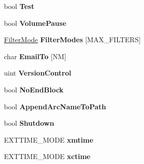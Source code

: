 \begin{DoxyCompactItemize}
\item 
\hypertarget{class_r_a_r_options_ad50969d316601f42fc2f74ac52f093e9}{bool {\bfseries Test}}\label{class_r_a_r_options_ad50969d316601f42fc2f74ac52f093e9}

\item 
\hypertarget{class_r_a_r_options_a0f8d1e8989441c929ec92ed304f2876a}{bool {\bfseries Volume\-Pause}}\label{class_r_a_r_options_a0f8d1e8989441c929ec92ed304f2876a}

\item 
\hypertarget{class_r_a_r_options_aa7bfad6f9becd063848c1431f6bcf654}{\hyperlink{struct_filter_mode}{Filter\-Mode} {\bfseries Filter\-Modes} \mbox{[}M\-A\-X\-\_\-\-F\-I\-L\-T\-E\-R\-S\mbox{]}}\label{class_r_a_r_options_aa7bfad6f9becd063848c1431f6bcf654}

\item 
\hypertarget{class_r_a_r_options_a52eba8e766200200a8af6b711e4b7929}{char {\bfseries Email\-To} \mbox{[}N\-M\mbox{]}}\label{class_r_a_r_options_a52eba8e766200200a8af6b711e4b7929}

\item 
\hypertarget{class_r_a_r_options_acd4940bd4fe84ff26444c2f5fad5d5bb}{uint {\bfseries Version\-Control}}\label{class_r_a_r_options_acd4940bd4fe84ff26444c2f5fad5d5bb}

\item 
\hypertarget{class_r_a_r_options_af68d3deb81260eb013ec986632655c02}{bool {\bfseries No\-End\-Block}}\label{class_r_a_r_options_af68d3deb81260eb013ec986632655c02}

\item 
\hypertarget{class_r_a_r_options_a6ac1a458fc60872fdb5d7f7003d0ec37}{bool {\bfseries Append\-Arc\-Name\-To\-Path}}\label{class_r_a_r_options_a6ac1a458fc60872fdb5d7f7003d0ec37}

\item 
\hypertarget{class_r_a_r_options_a3de54f7ef0a722cec1a44802595bf5dd}{bool {\bfseries Shutdown}}\label{class_r_a_r_options_a3de54f7ef0a722cec1a44802595bf5dd}

\item 
\hypertarget{class_r_a_r_options_a8e73d96b8920136dcfed7ae3574da95b}{E\-X\-T\-T\-I\-M\-E\-\_\-\-M\-O\-D\-E {\bfseries xmtime}}\label{class_r_a_r_options_a8e73d96b8920136dcfed7ae3574da95b}

\item 
\hypertarget{class_r_a_r_options_afd896e1aaadf3fb7cc2a3e1e2dcef1aa}{E\-X\-T\-T\-I\-M\-E\-\_\-\-M\-O\-D\-E {\bfseries xctime}}\label{class_r_a_r_options_afd896e1aaadf3fb7cc2a3e1e2dcef1aa}


\end{DoxyCompactItemize}
